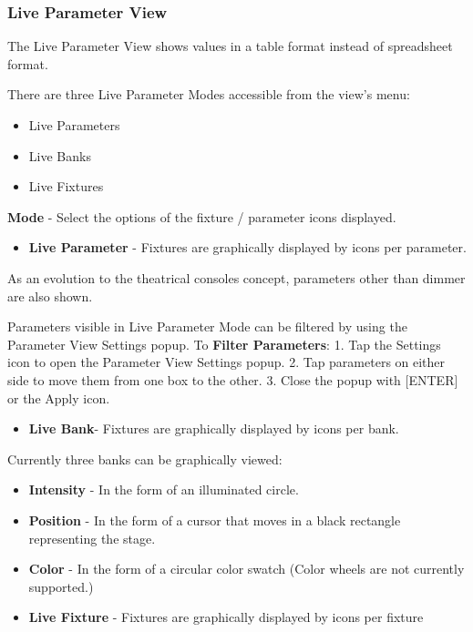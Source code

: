 \documentclass[
]{article}
\providecommand{\tightlist}{%
  \setlength{\itemsep}{0pt}\setlength{\parskip}{0pt}}
\begin{document}
\hypertarget{live-parameter-view}{%
\subsubsection{Live Parameter View}\label{live-parameter-view}}

The Live Parameter View shows values in a table format instead of spreadsheet format.

There are three Live Parameter Modes accessible from the view's menu:

\begin{itemize}
\item
  Live Parameters
\item
  Live Banks
\item
  Live Fixtures
\end{itemize}

\textbf{Mode} - Select the options of the fixture / parameter icons displayed.

\begin{itemize}
\tightlist
\item
  \textbf{Live Parameter} - Fixtures are graphically displayed by icons per parameter.
\end{itemize}

As an evolution to the theatrical consoles concept, parameters other than dimmer are also shown.

Parameters visible in Live Parameter Mode can be filtered by using the Parameter View Settings popup.
To \textbf{Filter Parameters}:
1. Tap the Settings icon to open the Parameter View Settings popup.
2. Tap parameters on either side to move them from one box to the other.
3. Close the popup with {[}ENTER{]} or the Apply icon.

\begin{itemize}
\tightlist
\item
  \textbf{Live Bank}- Fixtures are graphically displayed by icons per bank.
\end{itemize}

Currently three banks can be graphically viewed:

\begin{itemize}
\item
  \textbf{Intensity} - In the form of an illuminated circle.
\item
  \textbf{Position} - In the form of a cursor that moves in a black rectangle representing the stage.
\item
  \textbf{Color} - In the form of a circular color swatch (Color wheels are not currently supported.)
\item
  \textbf{Live Fixture} - Fixtures are graphically displayed by icons per fixture
\end{itemize}
\end{document}
